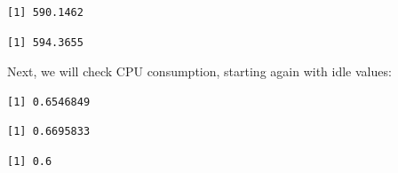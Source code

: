 \begin{Shaded}
\begin{Highlighting}[]
\SpecialCharTok{\$}
\end{Highlighting}
\end{Shaded}

\begin{verbatim}
[1] 590.1462
\end{verbatim}

\begin{Shaded}
\begin{Highlighting}[]
\SpecialCharTok{\$}
\end{Highlighting}
\end{Shaded}

\begin{verbatim}
[1] 594.3655
\end{verbatim}

Next, we will check CPU consumption, starting again with idle values:

\begin{Shaded}
\begin{Highlighting}[]
\SpecialCharTok{\$}
\end{Highlighting}
\end{Shaded}

\begin{verbatim}
[1] 0.6546849
\end{verbatim}

\begin{Shaded}
\begin{Highlighting}[]
\SpecialCharTok{\$}
\end{Highlighting}
\end{Shaded}

\begin{verbatim}
[1] 0.6695833
\end{verbatim}

\begin{Shaded}
\begin{Highlighting}[]
\SpecialCharTok{\$}
\end{Highlighting}
\end{Shaded}

\begin{verbatim}
[1] 0.6
\end{verbatim}

